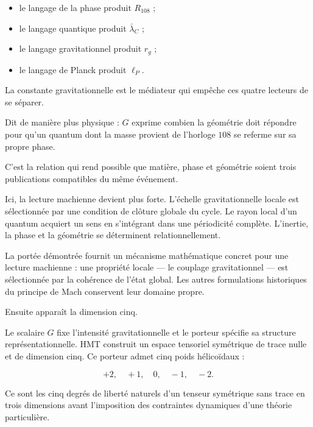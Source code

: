 \begin{itemize}[leftmargin=*,itemsep=0.35em]
\item le langage de la phase produit \(R_{108}\) ;
\item le langage quantique produit \(\bar\lambda_C\) ;
\item le langage gravitationnel produit \(r_g\) ;
\item le langage de Planck produit \(\ell_P\).
\end{itemize}

La constante gravitationnelle est le médiateur qui empêche ces quatre lecteurs de se séparer.\par

Dit de manière plus physique : \(G\) exprime combien la géométrie doit répondre pour qu’un quantum dont la masse provient de l’horloge \(108\) se referme sur sa propre phase.\par

C’est la relation qui rend possible que matière, phase et géométrie soient trois publications compatibles du même événement.\par

Ici, la lecture machienne devient plus forte. L’échelle gravitationnelle locale est sélectionnée par une condition de clôture globale du cycle. Le rayon local d’un quantum acquiert un sens en s’intégrant dans une périodicité complète. L’inertie, la phase et la géométrie se déterminent relationnellement.\par

La portée démontrée fournit un mécanisme mathématique concret pour une lecture machienne : une propriété locale — le couplage gravitationnel — est sélectionnée par la cohérence de l’état global. Les autres formulations historiques du principe de Mach conservent leur domaine propre.\par

Ensuite apparaît la dimension cinq.\par

Le scalaire \(G\) fixe l’intensité gravitationnelle et le porteur spécifie sa structure représentationnelle. HMT construit un espace tensoriel symétrique de trace nulle et de dimension cinq. Ce porteur admet cinq poids hélicoïdaux :\par

\[
+2,\quad +1,\quad 0,\quad -1,\quad -2.
\]

Ce sont les cinq degrés de liberté naturels d’un tenseur symétrique sans trace en trois dimensions avant l’imposition des contraintes dynamiques d’une théorie particulière.\par

